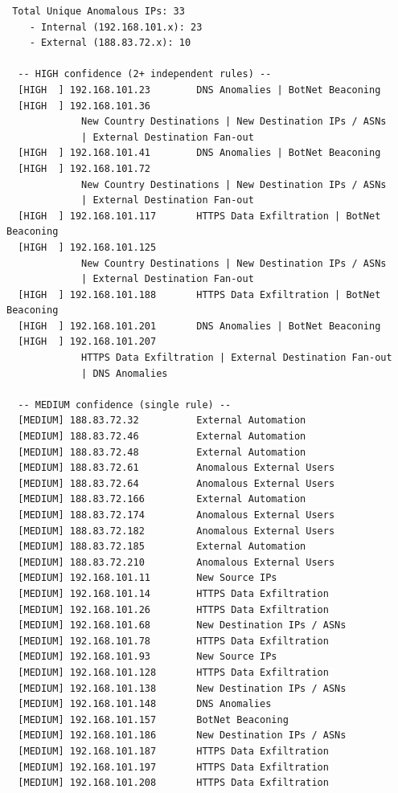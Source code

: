 \documentclass[
  11pt,
]{article}
\begin{document}
\begin{verbatim}
 Total Unique Anomalous IPs: 33
    - Internal (192.168.101.x): 23
    - External (188.83.72.x): 10

  -- HIGH confidence (2+ independent rules) --
  [HIGH  ] 192.168.101.23        DNS Anomalies | BotNet Beaconing
  [HIGH  ] 192.168.101.36
             New Country Destinations | New Destination IPs / ASNs
             | External Destination Fan-out
  [HIGH  ] 192.168.101.41        DNS Anomalies | BotNet Beaconing
  [HIGH  ] 192.168.101.72
             New Country Destinations | New Destination IPs / ASNs
             | External Destination Fan-out
  [HIGH  ] 192.168.101.117       HTTPS Data Exfiltration | BotNet Beaconing
  [HIGH  ] 192.168.101.125
             New Country Destinations | New Destination IPs / ASNs
             | External Destination Fan-out
  [HIGH  ] 192.168.101.188       HTTPS Data Exfiltration | BotNet Beaconing
  [HIGH  ] 192.168.101.201       DNS Anomalies | BotNet Beaconing
  [HIGH  ] 192.168.101.207
             HTTPS Data Exfiltration | External Destination Fan-out
             | DNS Anomalies

  -- MEDIUM confidence (single rule) --
  [MEDIUM] 188.83.72.32          External Automation
  [MEDIUM] 188.83.72.46          External Automation
  [MEDIUM] 188.83.72.48          External Automation
  [MEDIUM] 188.83.72.61          Anomalous External Users
  [MEDIUM] 188.83.72.64          Anomalous External Users
  [MEDIUM] 188.83.72.166         External Automation
  [MEDIUM] 188.83.72.174         Anomalous External Users
  [MEDIUM] 188.83.72.182         Anomalous External Users
  [MEDIUM] 188.83.72.185         External Automation
  [MEDIUM] 188.83.72.210         Anomalous External Users
  [MEDIUM] 192.168.101.11        New Source IPs
  [MEDIUM] 192.168.101.14        HTTPS Data Exfiltration
  [MEDIUM] 192.168.101.26        HTTPS Data Exfiltration
  [MEDIUM] 192.168.101.68        New Destination IPs / ASNs
  [MEDIUM] 192.168.101.78        HTTPS Data Exfiltration
  [MEDIUM] 192.168.101.93        New Source IPs
  [MEDIUM] 192.168.101.128       HTTPS Data Exfiltration
  [MEDIUM] 192.168.101.138       New Destination IPs / ASNs
  [MEDIUM] 192.168.101.148       DNS Anomalies
  [MEDIUM] 192.168.101.157       BotNet Beaconing
  [MEDIUM] 192.168.101.186       New Destination IPs / ASNs
  [MEDIUM] 192.168.101.187       HTTPS Data Exfiltration
  [MEDIUM] 192.168.101.197       HTTPS Data Exfiltration
  [MEDIUM] 192.168.101.208       HTTPS Data Exfiltration
\end{verbatim}
\end{document}
